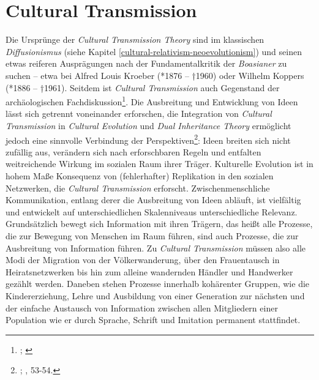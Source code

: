\documentclass[openany,twoside,twocolumn]{book}
\let\rmarkdownfootnote\footnote%
\def\footnote{\protect\rmarkdownfootnote}
\begin{document}
\hypertarget{cultural-transmission}{%
\section{Cultural Transmission}\label{cultural-transmission}}

Die Ursprünge der \emph{Cultural Transmission Theory} sind im klassischen \emph{Diffusionismus} (siehe Kapitel \ref{cultural-relativism-neoevolutionism}) und seinen etwas reiferen Ausprägungen nach der Fundamentalkritik der \emph{Boasianer} zu suchen -- etwa bei Alfred Louis Kroeber (*1876 -- †1960) oder Wilhelm Koppers (*1886 -- †1961). Seitdem ist \emph{Cultural Transmission} auch Gegenstand der archäologischen Fachdiskussion\footnote{\textcite{lyman_cultural_2008}; \textcite{shennan_evolution_2008}}. Die Ausbreitung und Entwicklung von Ideen lässt sich getrennt voneinander erforschen, die Integration von \emph{Cultural Transmission} in \emph{Cultural Evolution} und \emph{Dual Inheritance Theory} ermöglicht jedoch eine sinnvolle Verbindung der Perspektiven\footnote{\textcite{eerkens_cultural_2007}; \textcite{cavalli-sforza_cultural_1981}, 53-54.}: Ideen breiten sich nicht zufällig aus, verändern sich nach erforschbaren Regeln und entfalten weitreichende Wirkung im sozialen Raum ihrer Träger. Kulturelle Evolution ist in hohem Maße Konsequenz von (fehlerhafter) Replikation in den sozialen Netzwerken, die \emph{Cultural Transmission} erforscht. Zwischenmenschliche Kommunikation, entlang derer die Ausbreitung von Ideen abläuft, ist vielfältig und entwickelt auf unterschiedlichen Skalenniveaus unterschiedliche Relevanz. Grundsätzlich bewegt sich Information mit ihren Trägern, das heißt alle Prozesse, die zur Bewegung von Menschen im Raum führen, sind auch Prozesse, die zur Ausbreitung von Information führen. Zu \emph{Cultural Transmission} müssen also alle Modi der Migration von der Völkerwanderung, über den Frauentausch in Heiratsnetzwerken bis hin zum alleine wandernden Händler und Handwerker gezählt werden. Daneben stehen Prozesse innerhalb kohärenter Gruppen, wie die Kindererziehung, Lehre und Ausbildung von einer Generation zur nächsten und der einfache Austausch von Information zwischen allen Mitgliedern einer Population wie er durch Sprache, Schrift und Imitation permanent stattfindet.
\end{document}
